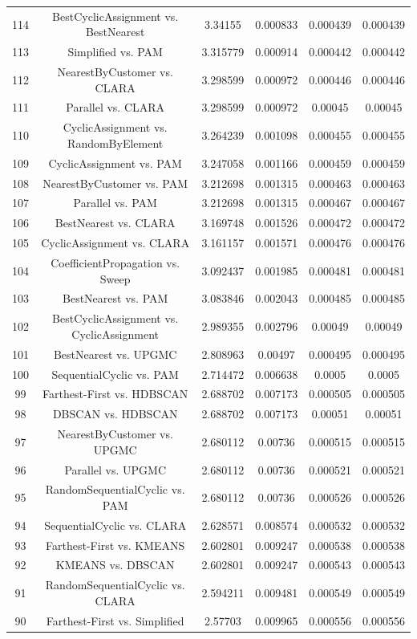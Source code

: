 \documentclass[a4paper,10pt]{article}
\begin{document}
\begin{landscape}
\begin{table}[!htp]
\begin{tabular}{cccccc}
114&BestCyclicAssignment vs. BestNearest&3.34155&0.000833&0.000439&0.000439\\
113&Simplified vs. PAM&3.315779&0.000914&0.000442&0.000442\\
112&NearestByCustomer vs. CLARA&3.298599&0.000972&0.000446&0.000446\\
111&Parallel vs. CLARA&3.298599&0.000972&0.00045&0.00045\\
110&CyclicAssignment vs. RandomByElement&3.264239&0.001098&0.000455&0.000455\\
109&CyclicAssignment vs. PAM&3.247058&0.001166&0.000459&0.000459\\
108&NearestByCustomer vs. PAM&3.212698&0.001315&0.000463&0.000463\\
107&Parallel vs. PAM&3.212698&0.001315&0.000467&0.000467\\
106&BestNearest vs. CLARA&3.169748&0.001526&0.000472&0.000472\\
105&CyclicAssignment vs. CLARA&3.161157&0.001571&0.000476&0.000476\\
104&CoefficientPropagation vs. Sweep&3.092437&0.001985&0.000481&0.000481\\
103&BestNearest vs. PAM&3.083846&0.002043&0.000485&0.000485\\
102&BestCyclicAssignment vs. CyclicAssignment&2.989355&0.002796&0.00049&0.00049\\
101&BestNearest vs. UPGMC&2.808963&0.00497&0.000495&0.000495\\
100&SequentialCyclic vs. PAM&2.714472&0.006638&0.0005&0.0005\\
99&Farthest-First vs. HDBSCAN&2.688702&0.007173&0.000505&0.000505\\
98&DBSCAN vs. HDBSCAN&2.688702&0.007173&0.00051&0.00051\\
97&NearestByCustomer vs. UPGMC&2.680112&0.00736&0.000515&0.000515\\
96&Parallel vs. UPGMC&2.680112&0.00736&0.000521&0.000521\\
95&RandomSequentialCyclic vs. PAM&2.680112&0.00736&0.000526&0.000526\\
94&SequentialCyclic vs. CLARA&2.628571&0.008574&0.000532&0.000532\\
93&Farthest-First vs. KMEANS&2.602801&0.009247&0.000538&0.000538\\
92&KMEANS vs. DBSCAN&2.602801&0.009247&0.000543&0.000543\\
91&RandomSequentialCyclic vs. CLARA&2.594211&0.009481&0.000549&0.000549\\
90&Farthest-First vs. Simplified&2.57703&0.009965&0.000556&0.000556\\

\end{tabular}
\end{table}
\end{landscape}
\end{document}
